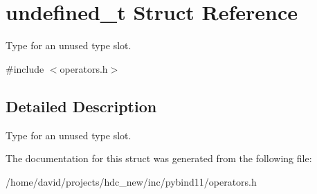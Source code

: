 \hypertarget{structundefined__t}{}\section{undefined\+\_\+t Struct Reference}
\label{structundefined__t}


Type for an unused type slot.  




{\ttfamily \#include $<$operators.\+h$>$}



\subsection{Detailed Description}
Type for an unused type slot. 

The documentation for this struct was generated from the following file\+:\begin{DoxyCompactItemize}
\item 
/home/david/projects/hdc\+\_\+new/inc/pybind11/operators.\+h\end{DoxyCompactItemize}
